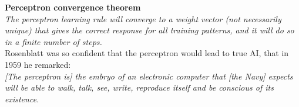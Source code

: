 \documentclass[10pt, compress]{beamer}
\begin{document}
%
%
%

\begin{frame}
  \textbf{Perceptron convergence theorem} \\ \hfill \break
  \textit{The perceptron learning rule will converge to a weight vector (not necessarily unique) that  gives  the  correct  response  for  all  training  patterns,  and it will do so in a finite number of steps.} \\ \hfill \break
  Rosenblatt was so confident that the perceptron would lead to true AI, that in 1959 he remarked: \\ \hfill \break
  \textit{[The perceptron is] the embryo of an electronic computer that [the Navy] expects will be able to walk, talk, see, write, reproduce itself and be conscious of its existence.}

\end{frame}
\end{document}
